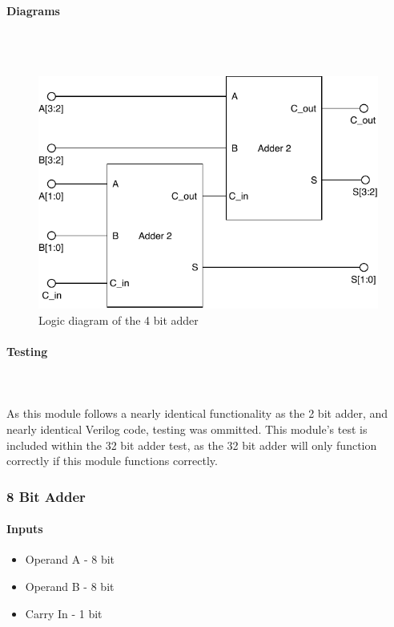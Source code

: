 \documentclass{article}
\begin{document}
       \paragraph{Diagrams}
       \hfill\\\\
       \begin{figure}[H]
           \centering
           \includegraphics{../diagrams/alu/adder/adder_4.pdf}
           \caption{Logic diagram of the 4 bit adder}
       \end{figure}
   
       \paragraph{Testing}
       \hfill\\\\
       As this module follows a nearly identical functionality as the 2
       bit adder, and nearly identical Verilog code, testing was ommitted.
       This module's test is included within the 32 bit adder test, as the
       32 bit adder will only function correctly if this module functions
       correctly.





       \subsubsection{8 Bit Adder}

       \paragraph{Inputs}
       \begin{itemize}
           \item Operand A - 8 bit
           \item Operand B - 8 bit
           \item Carry In - 1 bit
       \end{itemize}
   
\end{document}
